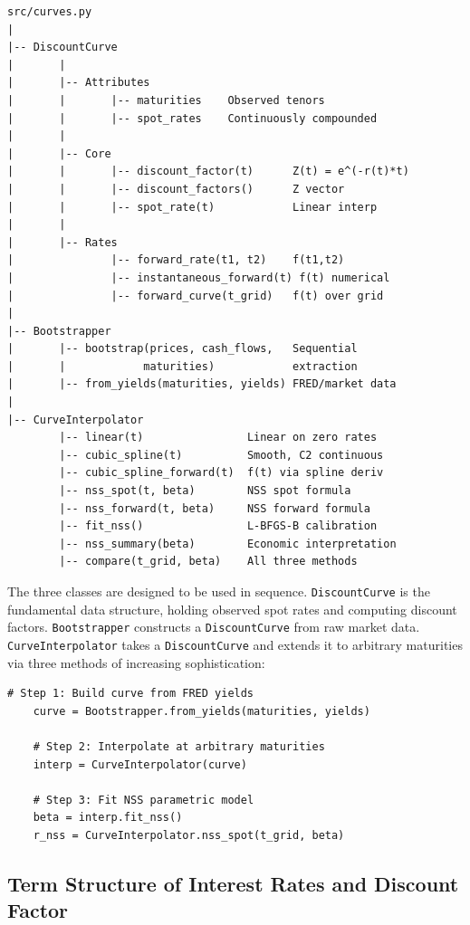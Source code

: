 \documentclass{article}
\theoremstyle{definition}  %
\theoremstyle{plain}  %
\numberwithin{definition}{section}
\numberwithin{proposition}{section}
\numberwithin{theorem}{section}
\numberwithin{equation}{section}
\begin{document}
\begin{verbatim}
src/curves.py
|
|-- DiscountCurve
|       |
|       |-- Attributes
|       |       |-- maturities    Observed tenors
|       |       |-- spot_rates    Continuously compounded
|       |
|       |-- Core
|       |       |-- discount_factor(t)      Z(t) = e^(-r(t)*t)
|       |       |-- discount_factors()      Z vector
|       |       |-- spot_rate(t)            Linear interp
|       |
|       |-- Rates
|               |-- forward_rate(t1, t2)    f(t1,t2)
|               |-- instantaneous_forward(t) f(t) numerical
|               |-- forward_curve(t_grid)   f(t) over grid
|
|-- Bootstrapper
|       |-- bootstrap(prices, cash_flows,   Sequential
|       |            maturities)            extraction
|       |-- from_yields(maturities, yields) FRED/market data
|
|-- CurveInterpolator
        |-- linear(t)                Linear on zero rates
        |-- cubic_spline(t)          Smooth, C2 continuous
        |-- cubic_spline_forward(t)  f(t) via spline deriv
        |-- nss_spot(t, beta)        NSS spot formula
        |-- nss_forward(t, beta)     NSS forward formula
        |-- fit_nss()                L-BFGS-B calibration
        |-- nss_summary(beta)        Economic interpretation
        |-- compare(t_grid, beta)    All three methods
\end{verbatim}

The three classes are designed to be used in sequence. \texttt{DiscountCurve} is the fundamental data structure, holding observed spot rates and computing discount factors. \texttt{Bootstrapper} constructs a \texttt{DiscountCurve} from raw market data. \texttt{CurveInterpolator} takes a \texttt{DiscountCurve} and extends it to arbitrary maturities via three methods of increasing sophistication:

\begin{lstlisting}[style = Pythonstyle]
    # Step 1: Build curve from FRED yields
    curve = Bootstrapper.from_yields(maturities, yields)

    # Step 2: Interpolate at arbitrary maturities
    interp = CurveInterpolator(curve)

    # Step 3: Fit NSS parametric model
    beta = interp.fit_nss()
    r_nss = CurveInterpolator.nss_spot(t_grid, beta)
\end{lstlisting}

\subsection{Term Structure of Interest Rates and Discount Factor}
\end{document}
